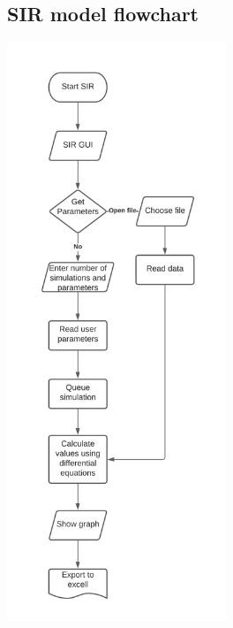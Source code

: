 \documentclass[11pt, a4paper]{article}
\begin{document}
\subsection{SIR model flowchart}
\includegraphics[height=17.3cm]{f_SIR.png}
\newpage
\end{document}

